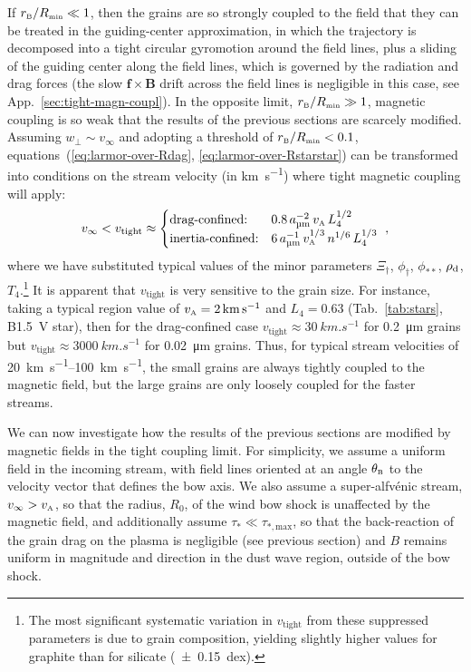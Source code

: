 If \(r_{\scriptscriptstyle\text{B}} / R_{\scriptscriptstyle\text{min}} \ll 1\), then the grains are so strongly coupled to the
field that they can be treated in the guiding-center approximation, in
which the trajectory is decomposed into a tight circular gyromotion
around the field lines, plus a sliding of the guiding center along the
field lines, which is governed by the radiation and drag forces (the
slow \(\bm{f} \times \bm{B}\) drift across the field lines is negligible in
this case, see App.~\ref{sec:tight-magn-coupl}).  In the opposite
limit, \(r_{\scriptscriptstyle\text{B}} / R_{\scriptscriptstyle\text{min}} \gg 1\), magnetic coupling is so weak that the
results of the previous sections are scarcely modified.  Assuming
\(w_\perp \sim v_\infty\) and adopting a threshold of
\(r_{\scriptscriptstyle\text{B}} / R_{\scriptscriptstyle\text{min}} < 0.1\), equations~(\ref{eq:larmor-over-Rdag},
\ref{eq:larmor-over-Rstarstar}) can be transformed into conditions on
the stream velocity (in \si{km.s^{-1}}) where tight magnetic coupling
will apply: \newcommand\freeze{\ensuremath{_{\text{tight}}}}
\begin{equation}
  \label{eq:velocity-strong-B-coupling}
  v_{\infty} < v\freeze \approx
  \begin{cases}
    \text{drag-confined:}
    & 0.8 \, a_{\si{\um}}^{-2} \, v\alfven \, L_4^{1/2}\\
    \text{inertia-confined:}
    & 6 \, a_{\si{\um}}^{-1} \, v\alfven^{1/3} \, n^{1/6} \, L_4^{1/3} \\
  \end{cases} \ ,
\end{equation}
where we have substituted typical values of the minor parameters
\(\Xi_\dag\), \(\phi_{\dag}\), \(\phi_{**}\), \(\rho_{\text{d}}\),
\(T_4\).\footnote{%
  The most significant systematic variation in \(v\freeze\) from these
  suppressed parameters is due to grain composition, yielding slightly
  higher values for graphite than for silicate (\SI{+-0.15}{dex}).} %
It is apparent that \(v\freeze\) is very sensitive to the grain size.
For instance, taking a typical \hii{} region value of
\(v_{\scriptscriptstyle\text{A}} = \SI{2}{km.s^{-1}}\) \citep{Arthur:2011a} and
\(L_4 = 0.63\) (Tab.~\ref{tab:stars}, B1.5~V star), then for the
drag-confined case \(v\freeze \approx \SI{30}{km.s^{-1}}\) for \SI{0.2}{\um}
grains but \(v\freeze \approx \SI{3000}{km.s^{-1}}\) for \SI{0.02}{\um}
grains. Thus, for typical stream velocities of
\SIrange{20}{100}{km.s^{-1}}, the small grains are always tightly
coupled to the magnetic field, but the large grains are only loosely
coupled for the faster streams.

We can now investigate how the results of the previous sections are
modified by magnetic fields in the tight coupling limit.  For
simplicity, we assume a uniform field in the incoming stream, with
field lines oriented at an angle \(\theta_{\scriptscriptstyle\text{B}}\) to the velocity vector that
defines the bow axis.  We also assume a super-alfvénic stream,
\(v_\infty > v_{\scriptscriptstyle\text{A}}\), so that the radius, \(R_0\), of the wind bow shock
is unaffected by the magnetic field, and additionally assume
\(\tau_* \ll \tau_{*, \text{max}}\), so that the back-reaction of the grain
drag on the plasma is negligible (see previous section) and \(B\)
remains uniform in magnitude and direction in the dust wave region,
outside of the bow shock.

